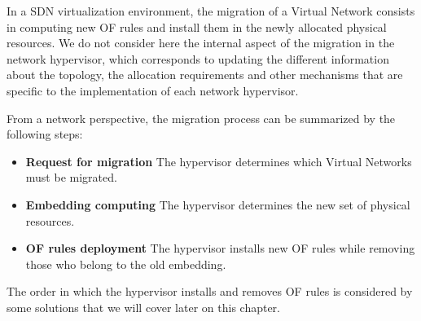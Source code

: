 In a SDN virtualization environment, the migration of a Virtual Network consists in computing new OF rules and install them in the newly allocated physical resources.
We do not consider here the internal aspect of the migration in the network hypervisor, which corresponds to updating the different information about the topology, the allocation requirements and other mechanisms that are specific to the implementation of each network hypervisor.

From a network perspective, the migration process can be summarized by the following steps:

\begin{itemize}
    \item \textbf{Request for migration} The hypervisor determines which Virtual Networks must be migrated.
    \item \textbf{Embedding computing} The hypervisor determines the new set of physical resources.
    \item \textbf{OF rules deployment} The hypervisor installs new OF rules while removing those who belong to the old embedding.
\end{itemize}

The order in which the hypervisor installs and removes OF rules is considered by some solutions that we will cover later on this chapter.